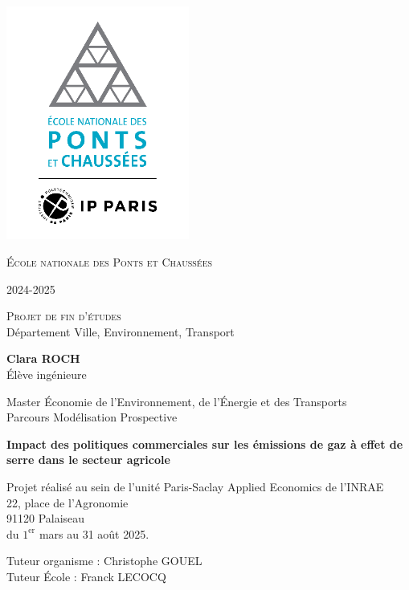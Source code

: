 \begin{titlepage}
    \vspace*{-2.5cm}
    \begin{center}
        \includegraphics[width=6cm]{logo_ponts.png}\par
        {\LARGE \textsc{École nationale des Ponts et Chaussées}\par}

        2024-2025

        \vspace{0.5cm}
        {\Large \textsc{Projet de fin d’études}} \\
        Département Ville, Environnement, Transport

        \vspace{0.5cm}
        {\large \textbf{Clara ROCH}} \\
        Élève ingénieure

        Master Économie de l’Environnement, de l’Énergie et des Transports \\
        Parcours Modélisation Prospective

        \vspace{0.5cm}
        {\LARGE \bfseries {Impact des politiques commerciales sur les émissions de gaz à effet de serre dans le secteur agricole} \par}

        \vspace{1cm}
        Projet réalisé au sein de l'unité Paris-Saclay Applied Economics de l'INRAE \\
        22, place de l'Agronomie \\
        91120 Palaiseau \\
        du $1^{\text{er}}$ mars au 31 août 2025.

        \vspace{1cm}
        {\large Tuteur organisme : Christophe GOUEL \\
            Tuteur École : Franck LECOCQ}

    \end{center}
\end{titlepage}
